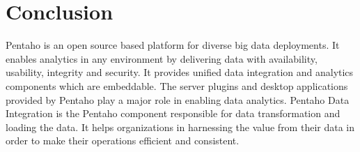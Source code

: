 \documentclass[9pt,twocolumn,twoside]{../../styles/osajnl}
\begin{document}
\section{Conclusion}

Pentaho is an open source based platform for diverse big data
deployments. It enables analytics in any environment by delivering
data with availability, usability, integrity and security. It provides
unified data integration and analytics components which are
embeddable. The server plugins and desktop applications provided by
Pentaho play a major role in enabling data analytics. Pentaho Data
Integration is the Pentaho component responsible for data
transformation and loading the data. It helps organizations in
harnessing the value from their data in order to make their operations
efficient and consistent.




 

\newpage

\appendix
\end{document}
